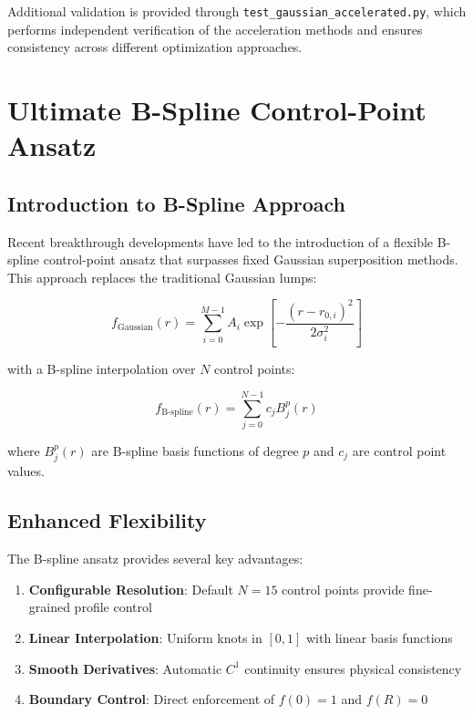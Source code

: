 \documentclass[12pt,a4paper]{article}
\begin{document}
Additional validation is provided through \texttt{test\_gaussian\_accelerated.py}, which performs independent verification of the acceleration methods and ensures consistency across different optimization approaches.

\section{Ultimate B-Spline Control-Point Ansatz}

\subsection{Introduction to B-Spline Approach}

Recent breakthrough developments have led to the introduction of a flexible B-spline control-point ansatz that surpasses fixed Gaussian superposition methods. This approach replaces the traditional Gaussian lumps:

\begin{equation}
f_{\text{Gaussian}}(r) = \sum_{i=0}^{M-1} A_i \exp\left[-\frac{(r - r_{0,i})^2}{2\sigma_i^2}\right]
\end{equation}

with a B-spline interpolation over $N$ control points:

\begin{equation}
f_{\text{B-spline}}(r) = \sum_{j=0}^{N-1} c_j B_j^p(r)
\end{equation}

where $B_j^p(r)$ are B-spline basis functions of degree $p$ and $c_j$ are control point values.

\subsection{Enhanced Flexibility}

The B-spline ansatz provides several key advantages:

\begin{enumerate}
\item \textbf{Configurable Resolution}: Default $N=15$ control points provide fine-grained profile control
\item \textbf{Linear Interpolation}: Uniform knots in $[0,1]$ with linear basis functions
\item \textbf{Smooth Derivatives}: Automatic $C^1$ continuity ensures physical consistency
\item \textbf{Boundary Control}: Direct enforcement of $f(0) = 1$ and $f(R) = 0$
\end{enumerate}
\end{document}
